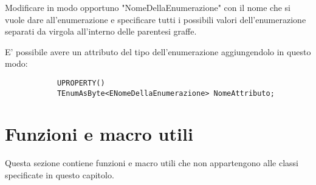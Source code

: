         Modificare in modo opportuno "NomeDellaEnumerazione" con il nome che si vuole dare all'enumerazione
        e specificare tutti i possibili valori dell'enumerazione separati da virgola all'interno delle parentesi graffe.

        E' possibile avere un attributo del tipo dell'enumerazione aggiungendolo in questo modo:

        \begin{verbatim}
            UPROPERTY()
            TEnumAsByte<ENomeDellaEnumerazione> NomeAttributo;
        \end{verbatim}


    \section{Funzioni e macro utili}

        Questa sezione contiene funzioni e macro utili che non appartengono alle classi specificate in questo capitolo.

